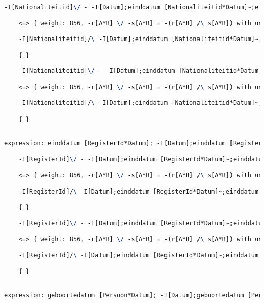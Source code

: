 \begin{lstlisting}[language=TeX]
    -I[Nationaliteitid]\/ - -I[Datum];einddatum [Nationaliteitid*Datum]~;einddatum [Nationaliteitid*Datum]

    <=> { weight: 856, -r[A*B] \/ -s[A*B] = -(r[A*B] /\ s[A*B]) with unifier: {A->I[Nationaliteitid], B->I[Nationaliteitid], r->einddatum [Nationaliteitid*Datum];-I[Datum];einddatum [Nationaliteitid*Datum]~, s->I[Nationaliteitid]} }

    -I[Nationaliteitid]/\ -I[Datum];einddatum [Nationaliteitid*Datum]~;einddatum [Nationaliteitid*Datum]

    { }

    -I[Nationaliteitid]\/ - -I[Datum];einddatum [Nationaliteitid*Datum]~;einddatum [Nationaliteitid*Datum]

    <=> { weight: 856, -r[A*B] \/ -s[A*B] = -(r[A*B] /\ s[A*B]) with unifier: {A->I[Nationaliteitid], B->I[Nationaliteitid], r->I[Nationaliteitid], s->einddatum [Nationaliteitid*Datum];-I[Datum];einddatum [Nationaliteitid*Datum]~} }

    -I[Nationaliteitid]/\ -I[Datum];einddatum [Nationaliteitid*Datum]~;einddatum [Nationaliteitid*Datum]

    { }


expression: einddatum [RegisterId*Datum]; -I[Datum];einddatum [RegisterId*Datum]~ |- -I[RegisterId]

    -I[RegisterId]\/ - -I[Datum];einddatum [RegisterId*Datum]~;einddatum [RegisterId*Datum]

    <=> { weight: 856, -r[A*B] \/ -s[A*B] = -(r[A*B] /\ s[A*B]) with unifier: {A->I[RegisterId], B->I[RegisterId], r->einddatum [RegisterId*Datum];-I[Datum];einddatum [RegisterId*Datum]~, s->I[RegisterId]} }

    -I[RegisterId]/\ -I[Datum];einddatum [RegisterId*Datum]~;einddatum [RegisterId*Datum]

    { }

    -I[RegisterId]\/ - -I[Datum];einddatum [RegisterId*Datum]~;einddatum [RegisterId*Datum]

    <=> { weight: 856, -r[A*B] \/ -s[A*B] = -(r[A*B] /\ s[A*B]) with unifier: {A->I[RegisterId], B->I[RegisterId], r->I[RegisterId], s->einddatum [RegisterId*Datum];-I[Datum];einddatum [RegisterId*Datum]~} }

    -I[RegisterId]/\ -I[Datum];einddatum [RegisterId*Datum]~;einddatum [RegisterId*Datum]

    { }


expression: geboortedatum [Persoon*Datum]; -I[Datum];geboortedatum [Persoon*Datum]~ |- -I[Persoon]


\end{lstlisting}
